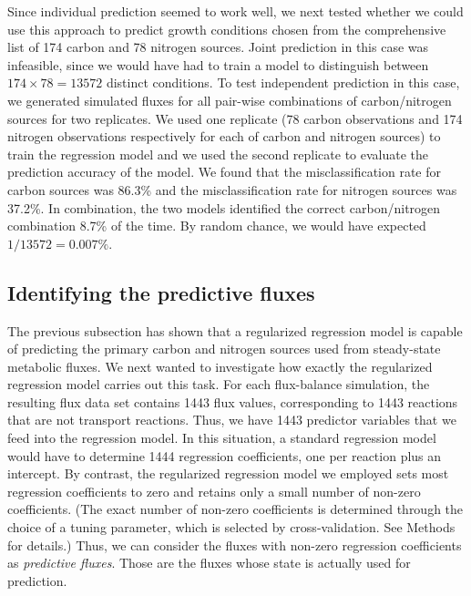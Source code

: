 \documentclass[12pt]{article}
\begin{document}
Since individual prediction seemed to work well, we next tested whether we could use this approach to predict growth conditions chosen from the comprehensive list of 174 carbon and 78 nitrogen sources. Joint prediction in this case was infeasible, since we would have had to train a model to distinguish between $174\times78=13572$ distinct conditions. To test independent prediction in this case, we generated simulated fluxes for all pair-wise combinations of carbon/nitrogen sources for two replicates. We used one replicate (78 carbon observations and 174 nitrogen observations respectively for each of carbon and nitrogen sources) to train the regression model and we used the second replicate to evaluate the prediction accuracy of the model. We found that the misclassification rate for carbon sources was 86.3\% and the misclassification rate for nitrogen sources was 37.2\%. In combination, the two models identified the correct carbon/nitrogen combination 8.7\% of the time. By random chance, we would have expected $1/13572=0.007\%$.


\subsection*{Identifying the predictive fluxes}

The previous subsection has shown that a regularized regression model is capable of predicting the primary carbon and nitrogen sources used from steady-state metabolic fluxes. We next wanted to investigate how exactly the regularized regression model carries out this task. For each flux-balance simulation, the resulting flux data set contains 1443 flux values, corresponding to 1443 reactions that are not transport reactions. Thus, we have 1443 predictor variables that we feed into the regression model. In this situation, a standard regression model would have to determine 1444 regression coefficients, one per reaction plus an intercept. By contrast, the regularized regression model we employed sets most regression coefficients to zero and retains only a small number of non-zero coefficients. (The exact number of non-zero coefficients is determined through the choice of a tuning parameter, which is selected by cross-validation. See Methods for details.) Thus, we can consider the fluxes with non-zero regression coefficients as \emph{predictive fluxes}. Those are the fluxes whose state is actually used for prediction.
\end{document}
